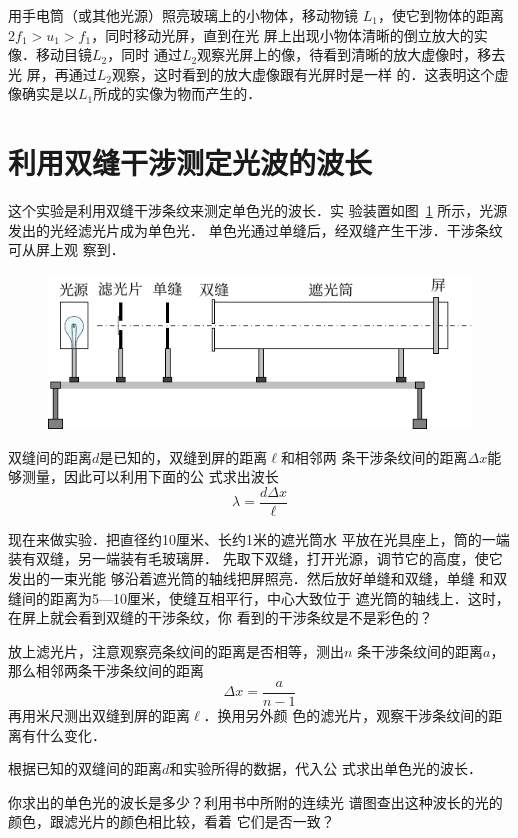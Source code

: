 用手电筒（或其他光源）照亮玻璃上的小物体，移动物镜
$L_1$，使它到物体的距离$2f_1>u_1>f_1$，同时移动光屏，直到在光
屏上出现小物体清晰的倒立放大的实像．移动目镜$L_2$，同时
通过$L_2$观察光屏上的像，待看到清晰的放大虚像时，移去光
屏，再通过$L_2$观察，这时看到的放大虚像跟有光屏时是一样
的．这表明这个虚像确实是以$L_1$所成的实像为物而产生的．

\section{利用双缝干涉测定光波的波长}

这个实验是利用双缝干涉条纹来测定单色光的波长．实
验装置如图~\ref{fig_C_10-9} 所示，光源发出的光经滤光片成为单色光．
单色光通过单缝后，经双缝产生干涉．干涉条纹可从屏上观
察到．
\begin{figure}[htbp]
    \centering
    \includegraphics{fig/C/10-9.pdf}
    \caption{}\label{fig_C_10-9}
\end{figure}

双缝间的距离$d$是已知的，双缝到屏的距离$\ell$和相邻两
条干涉条纹间的距离$\Delta x$能够测量，因此可以利用下面的公
式求出波长
\[\lambda=\frac{d\Delta x}{\ell} \]

现在来做实验．把直径约10厘米、长约1米的遮光筒水
平放在光具座上，筒的一端装有双缝，另一端装有毛玻璃屏．
先取下双缝，打开光源，调节它的高度，使它发出的一束光能
够沿着遮光筒的轴线把屏照亮．然后放好单缝和双缝，单缝
和双缝间的距离为5—10厘米，使缝互相平行，中心大致位于
遮光筒的轴线上．这时，在屏上就会看到双缝的干涉条纹，你
看到的干涉条纹是不是彩色的？

放上滤光片，注意观察亮条纹间的距离是否相等，测出$n$
条干涉条纹间的距离$a$，那么相邻两条干涉条纹间的距离
\[\Delta x=\frac{a}{n-1} \]
再用米尺测出双缝到屏的距离$\ell$．换用另外颜
色的滤光片，观察干涉条纹间的距离有什么变化．

根据已知的双缝间的距离$d$和实验所得的数据，代入公
式求出单色光的波长．

你求出的单色光的波长是多少？利用书中所附的连续光
谱图查出这种波长的光的颜色，跟滤光片的颜色相比较，看着
它们是否一致？

